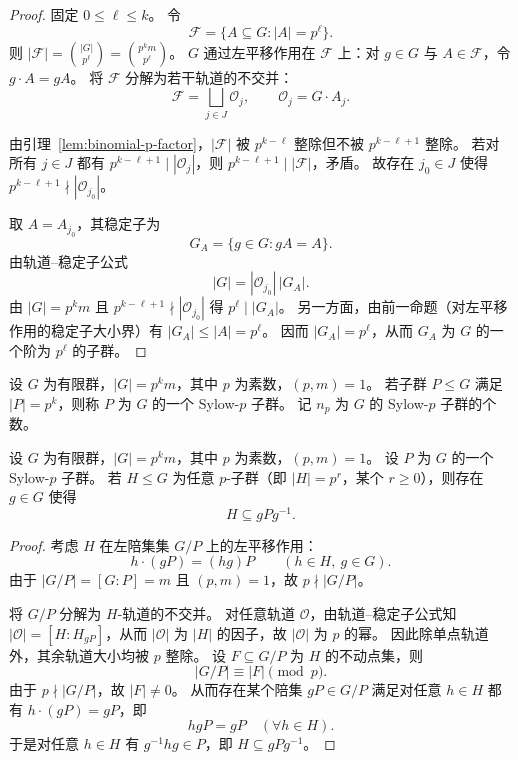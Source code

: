 \documentclass[lang=cn,a4paper,newtx]{elegantbook}
\begin{document}
\begin{proof}
  固定 $0\le \ell\le k$。
  令
  \[
    \mathcal{F}=\{A\subseteq G:|A|=p^{\ell}\}.
  \]
  则 $|\mathcal{F}|=\binom{|G|}{p^{\ell}}=\binom{p^k m}{p^{\ell}}$。
  $G$ 通过左平移作用在 $\mathcal{F}$ 上：对 $g\in G$ 与 $A\in\mathcal{F}$，令 $g\cdot A=gA$。
  将 $\mathcal{F}$ 分解为若干轨道的不交并：
  \[
    \mathcal{F}=\bigsqcup_{j\in J} \mathcal{O}_j,
    \qquad \mathcal{O}_j=G\cdot A_j.
  \]

  由引理~\ref{lem:binomial-p-factor}，$|\mathcal{F}|$ 被 $p^{k-\ell}$ 整除但不被 $p^{k-\ell+1}$ 整除。
  若对所有 $j\in J$ 都有 $p^{k-\ell+1}\mid |\mathcal{O}_j|$，则 $p^{k-\ell+1}\mid |\mathcal{F}|$，矛盾。
  故存在 $j_0\in J$ 使得 $p^{k-\ell+1}\nmid |\mathcal{O}_{j_0}|$。

  取 $A=A_{j_0}$，其稳定子为
  \[
    G_A=\{g\in G:gA=A\}.
  \]
  由轨道--稳定子公式
  \[
    |G|=|\mathcal{O}_{j_0}|\,|G_A|.
  \]
  由 $|G|=p^k m$ 且 $p^{k-\ell+1}\nmid |\mathcal{O}_{j_0}|$ 得 $p^{\ell}\mid |G_A|$。
  另一方面，由前一命题（对左平移作用的稳定子大小界）有 $|G_A|\le |A|=p^{\ell}$。
  因而 $|G_A|=p^{\ell}$，从而 $G_A$ 为 $G$ 的一个阶为 $p^{\ell}$ 的子群。
\end{proof}

\begin{definition}[Sylow-$p$ 子群]
  设 $G$ 为有限群，$|G|=p^k m$，其中 $p$ 为素数，$(p,m)=1$。
  若子群 $P\le G$ 满足 $|P|=p^k$，则称 $P$ 为 $G$ 的一个 Sylow-$p$ 子群。
  记 $n_p$ 为 $G$ 的 Sylow-$p$ 子群的个数。
\end{definition}

\begin{theorem}[Sylow 定理(II)]\label{sylow-II}
  设 $G$ 为有限群，$|G|=p^k m$，其中 $p$ 为素数，$(p,m)=1$。
  设 $P$ 为 $G$ 的一个 Sylow-$p$ 子群。
  若 $H\le G$ 为任意 $p$-子群（即 $|H|=p^r$，某个 $r\ge 0$），则存在 $g\in G$ 使得
  \[
    H\subseteq gPg^{-1}.
  \]
\end{theorem}

\begin{proof}
  考虑 $H$ 在左陪集集 $G/P$ 上的左平移作用：
  \[
    h\cdot (gP)=(hg)P\qquad (h\in H,\ g\in G).
  \]
  由于 $|G/P|=[G:P]=m$ 且 $(p,m)=1$，故 $p\nmid |G/P|$。

  将 $G/P$ 分解为 $H$-轨道的不交并。
  对任意轨道 $\mathcal{O}$，由轨道--稳定子公式知 $|\mathcal{O}|=[H:H_{gP}]$，从而 $|\mathcal{O}|$ 为 $|H|$ 的因子，故 $|\mathcal{O}|$ 为 $p$ 的幂。
  因此除单点轨道外，其余轨道大小均被 $p$ 整除。
  设 $F\subseteq G/P$ 为 $H$ 的不动点集，则
  \[
    |G/P|\equiv |F|\pmod p.
  \]
  由于 $p\nmid |G/P|$，故 $|F|\ne 0$。
  从而存在某个陪集 $gP\in G/P$ 满足对任意 $h\in H$ 都有 $h\cdot (gP)=gP$，即
  \[
    hgP=gP\quad (\forall h\in H).
  \]
  于是对任意 $h\in H$ 有 $g^{-1}hg\in P$，即 $H\subseteq gPg^{-1}$。
\end{proof}
\end{document}
